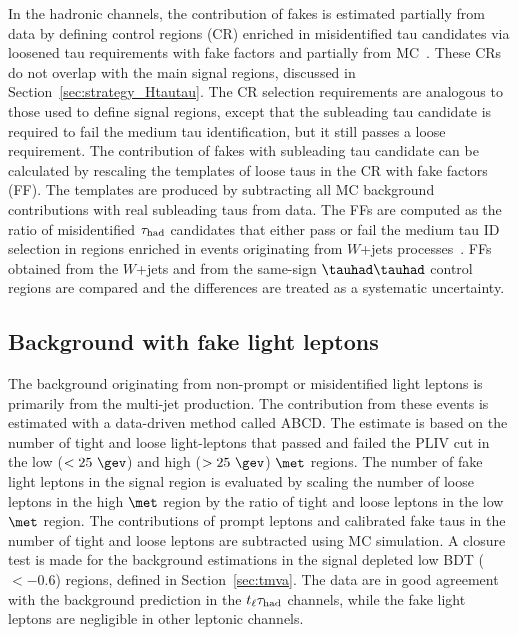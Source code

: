 In the hadronic channels, the contribution of fakes is estimated partially from data by defining control regions (CR)
enriched in misidentified
tau candidates via loosened tau requirements with fake factors and partially from MC~\cite{ATLAS-CONF-2021-044}.
These CRs do not overlap with the main signal regions, discussed in Section~\ref{sec:strategy_Htautau}.
The CR selection requirements are analogous to those used to define signal regions, except
that the subleading tau candidate is required to fail the medium tau identification, but it still passes a loose requirement.
The contribution of fakes with subleading tau candidate can be calculated by rescaling the templates of loose taus in the CR
with fake factors (FF).
The templates are produced by subtracting all MC background contributions with real subleading taus from data.
The FFs are computed as the ratio of misidentified $\tau_\text{had}$ candidates that either pass or fail the medium tau ID selection in regions enriched in events originating from 
$W$+jets processes~\cite{ATLAS-CONF-2021-044}. 
FFs obtained from the $W$+jets and from the same-sign $\thadhad$ control regions are compared and the differences are treated as a systematic uncertainty.

\subsection{Background with fake light leptons}
The background originating from non-prompt or misidentified light leptons is primarily from the multi-jet production.
The contribution from these events is estimated with a data-driven method called ABCD.
The estimate is based on the number of tight and loose light-leptons that passed and failed the PLIV cut in the low ($<25~\gev$) and high
($>25~\gev$) $\met$ regions. The number of
fake light leptons in the signal region is evaluated by scaling the number of loose leptons in the high $\met$ region by the ratio of tight and loose leptons in the
low $\met$ region. The contributions of prompt leptons and calibrated fake taus in the number of tight and loose leptons are subtracted using MC simulation.
A closure test is made for the background estimations in the signal depleted low BDT ($<-0.6$) regions, defined in Section~\ref{sec:tmva}.
The data are in good agreement with the background prediction in the
$t_{\ell}\tau_{\mathrm{had}}$ channels, while the fake light leptons are negligible in other leptonic channels. 

